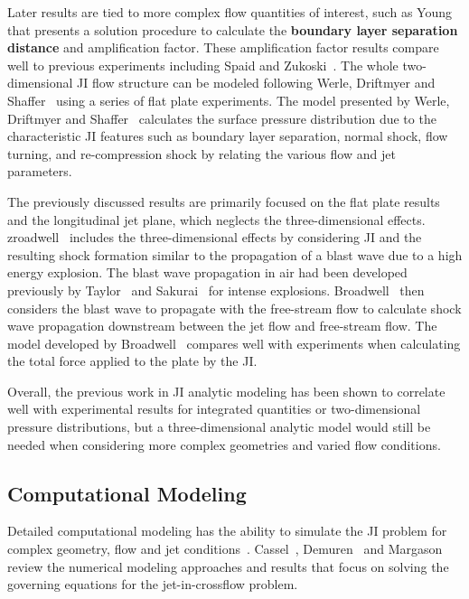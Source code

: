 \documentclass[12pt]{article}
\begin{document}
Later results are tied to more complex flow quantities of interest, such as Young~\cite{young1972viscous} that presents a solution procedure to calculate the \textbf{boundary layer separation distance} and amplification factor. These amplification factor results compare well to previous experiments including Spaid and Zukoski~\cite{spaid1968study}. The whole two-dimensional JI flow structure can be modeled following Werle, Driftmyer and Shaffer~\cite{werle1972jet} using a series of flat plate experiments. The model presented by Werle, Driftmyer and Shaffer~\cite{werle1972jet} calculates the surface pressure distribution due to the characteristic JI features such as boundary layer separation, normal shock, flow turning, and re-compression shock by relating the various flow and jet parameters.

The previously discussed results are primarily focused on the flat plate results and
the longitudinal jet plane, which neglects the three-dimensional effects. zroadwell~\cite{broadwell1963analysis} includes the three-dimensional effects by considering JI and the resulting shock formation similar to the propagation of a blast wave due to a high energy explosion. The blast wave propagation in air had been developed previously by Taylor~\cite{taylor1950formation} and Sakurai~\cite{sakurai1953propagation,sakurai1954propagation} for intense explosions. Broadwell~\cite{broadwell1963analysis} then considers the blast wave to propagate with the free-stream flow to calculate shock wave propagation downstream between the jet flow and free-stream flow. The model developed by Broadwell~\cite{broadwell1963analysis} compares well with experiments when calculating the total force applied to the plate by the JI.

Overall, the previous work in JI analytic modeling has been shown to correlate well with experimental results for integrated quantities or two-dimensional pressure distributions, but a three-dimensional analytic model would still be needed when considering more complex geometries and varied flow conditions.

\subsection{Computational Modeling}
Detailed computational modeling has the ability to simulate the JI problem for complex geometry, flow and jet conditions~\cite{warfield1989calculation,graham1999numerical,sahu2024,amick1963experimental,despirito2011factors,despirito2012lateral,despirito2014predictions,despirito2012transient,despirito2015turbulence,gnemmi2008computational}. Cassel~\cite{cassel2003applying}, Demuren~\cite{demuren1994modeling} and Margason~\cite{margason1993fifty} review the numerical modeling approaches and results that focus on solving the governing equations for the jet-in-crossflow problem.
\end{document}
